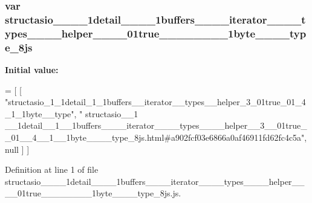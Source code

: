 \subsubsection[{structasio\+\_\+\+\_\+1\+\_\+\+\_\+1detail\+\_\+\+\_\+1\+\_\+\+\_\+1buffers\+\_\+\+\_\+\+\_\+\+\_\+iterator\+\_\+\+\_\+\+\_\+\+\_\+types\+\_\+\+\_\+\+\_\+\+\_\+helper\+\_\+\+\_\+3\+\_\+\+\_\+01true\+\_\+\+\_\+01\+\_\+\+\_\+4\+\_\+\+\_\+1\+\_\+\+\_\+1byte\+\_\+\+\_\+\+\_\+\+\_\+type\+\_\+8js}]{\setlength{\rightskip}{0pt plus 5cm}var structasio\+\_\+\+\_\+\_\+\+\_\+1detail\+\_\+\+\_\+\_\+\+\_\+1buffers\+\_\+\+\_\+\+\_\+\+\_\+iterator\+\_\+\+\_\+\+\_\+\+\_\+types\+\_\+\+\_\+\+\_\+\+\_\+helper\+\_\+\+\_\+\_\+\+\_\+01true\+\_\+\+\_\+\_\+\+\_\+\_\+\+\_\+\_\+\+\_\+1byte\+\_\+\+\_\+\+\_\+\+\_\+type\+\_\+8js}\label{structasio____1____1detail____1____1buffers________iterator________types________helper____3____00d830caa67be3910b819a7e5c3688ab1_aa7b8a1f39043344b1c679a076d3ee379}
{\bfseries Initial value\+:}
\begin{DoxyCode}
=
[
    [ \textcolor{stringliteral}{"structasio\_1\_1detail\_1\_1buffers\_\_iterator\_\_types\_\_helper\_3\_01true\_01\_4\_1\_1byte\_\_type"}, \textcolor{stringliteral}{"
      structasio\_\_1
      \_\_1detail\_\_1\_\_1buffers\_\_\_\_iterator\_\_\_\_types\_\_\_\_helper\_\_3\_\_01true\_\_01\_\_4\_\_1\_\_1byte\_\_\_\_type\_8js.html#a902fcf03e6866a0af46911fd62fc4c5a"}, null ]
]
\end{DoxyCode}


Definition at line 1 of file structasio\+\_\+\+\_\+\_\+\+\_\+1detail\+\_\+\+\_\+\_\+\+\_\+1buffers\+\_\+\+\_\+\+\_\+\+\_\+iterator\+\_\+\+\_\+\+\_\+\+\_\+types\+\_\+\+\_\+\+\_\+\+\_\+helper\+\_\+\+\_\+\_\+\+\_\+01true\+\_\+\+\_\+\_\+\+\_\+\_\+\+\_\+\_\+\+\_\+1byte\+\_\+\+\_\+\+\_\+\+\_\+type\+\_\+8js.\+js.

